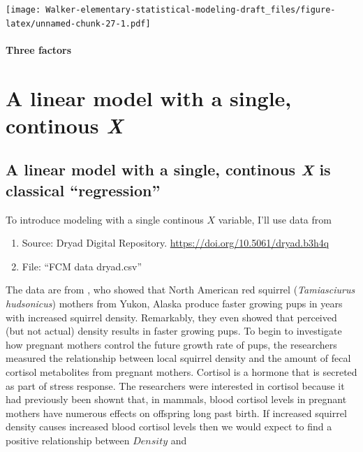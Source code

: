 \documentclass[]{book}
\providecommand{\tightlist}{%
  \setlength{\itemsep}{0pt}\setlength{\parskip}{0pt}}
\begin{document}
\texttt{[image: Walker-elementary-statistical-modeling-draft\_files/figure-latex/unnamed-chunk-27-1.pdf]}

\subsubsection{Three factors}\label{three-factors}

\chapter{\texorpdfstring{A linear model with a single, continous
\emph{X}}{A linear model with a single, continous X}}\label{a-linear-model-with-a-single-continous-x}

\section{\texorpdfstring{A linear model with a single, continous
\emph{X} is classical
``regression''}{A linear model with a single, continous X is classical regression}}\label{a-linear-model-with-a-single-continous-x-is-classical-regression}

To introduce modeling with a single continous \(X\) variable, I'll use
data from

\begin{enumerate}
\def\labelenumi{\arabic{enumi}.}
\tightlist
\item
  Source: Dryad Digital Repository.
  \url{https://doi.org/10.5061/dryad.b3h4q}
\item
  File: ``FCM data dryad.csv''
\end{enumerate}

The data are from \citet{Dantzer_xxx}, who showed that North American
red squirrel (\emph{Tamiasciurus hudsonicus}) mothers from Yukon, Alaska
produce faster growing pups in years with increased squirrel density.
Remarkably, they even showed that perceived (but not actual) density
results in faster growing pups. To begin to investigate how pregnant
mothers control the future growth rate of pups, the researchers measured
the relationship between local squirrel density and the amount of fecal
cortisol metabolites from pregnant mothers. Cortisol is a hormone that
is secreted as part of stress response. The researchers were interested
in cortisol because it had previously been shownt that, in mammals,
blood cortisol levels in pregnant mothers have numerous effects on
offspring long past birth. If increased squirrel density causes
increased blood cortisol levels then we would expect to find a positive
relationship between \(Density\) and
\end{document}
